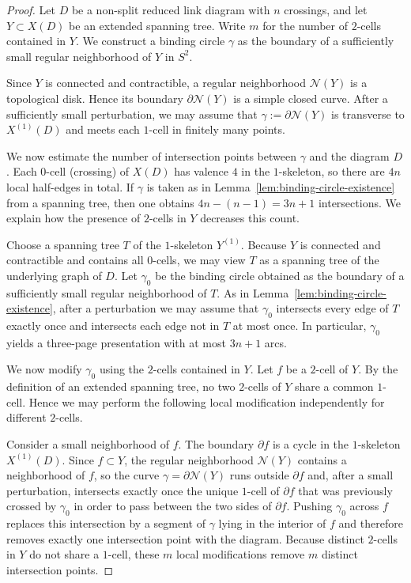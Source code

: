 \documentclass[11pt,a4paper]{amsart}
\begin{document}
\begin{proof}
Let $D$ be a non-split reduced link diagram with $n$ crossings, and let $Y \subset X(D)$ be an extended spanning tree.
Write $m$ for the number of $2$-cells contained in $Y$.
We construct a binding circle $\gamma$ as the boundary of a sufficiently small regular neighborhood of $Y$ in $S^2$.

Since $Y$ is connected and contractible, a regular neighborhood $\mathcal{N}(Y)$ is a topological disk.
Hence its boundary $\partial \mathcal{N}(Y)$ is a simple closed curve.
After a sufficiently small perturbation, we may assume that $\gamma:=\partial \mathcal{N}(Y)$ is transverse to $X^{(1)}(D)$ and meets each $1$-cell in finitely many points.

We now estimate the number of intersection points between $\gamma$ and the diagram $D$.
Each $0$-cell (crossing) of $X(D)$ has valence $4$ in the $1$-skeleton, so there are $4n$ local half-edges in total.
If $\gamma$ is taken as in Lemma~\ref{lem:binding-circle-existence} from a spanning tree, then one obtains $4n-(n-1)=3n+1$ intersections.
We explain how the presence of $2$-cells in $Y$ decreases this count.

Choose a spanning tree $T$ of the $1$-skeleton $Y^{(1)}$.
Because $Y$ is connected and contractible and contains all $0$-cells, we may view $T$ as a spanning tree of the underlying graph of $D$.
Let $\gamma_0$ be the binding circle obtained as the boundary of a sufficiently small regular neighborhood of $T$.
As in Lemma~\ref{lem:binding-circle-existence}, after a perturbation we may assume that $\gamma_0$ intersects every edge of $T$ exactly once and intersects each edge not in $T$ at most once.
In particular, $\gamma_0$ yields a three-page presentation with at most $3n+1$ arcs.

We now modify $\gamma_0$ using the $2$-cells contained in $Y$.
Let $f$ be a $2$-cell of $Y$.
By the definition of an extended spanning tree, no two $2$-cells of $Y$ share a common $1$-cell.
Hence we may perform the following local modification independently for different $2$-cells.

Consider a small neighborhood of $f$.
The boundary $\partial f$ is a cycle in the $1$-skeleton $X^{(1)}(D)$.
Since $f \subset Y$, the regular neighborhood $\mathcal{N}(Y)$ contains a neighborhood of $f$,
so the curve $\gamma=\partial \mathcal{N}(Y)$ runs outside $\partial f$ and, after a small perturbation, intersects exactly once the unique $1$-cell of $\partial f$ that was previously crossed by $\gamma_0$ in order to pass between the two sides of $\partial f$.
Pushing $\gamma_0$ across $f$ replaces this intersection by a segment of $\gamma$ lying in the interior of $f$ and therefore removes exactly one intersection point with the diagram.
Because distinct $2$-cells in $Y$ do not share a $1$-cell, these $m$ local modifications remove $m$ distinct intersection points.


\end{proof}
\end{document}
